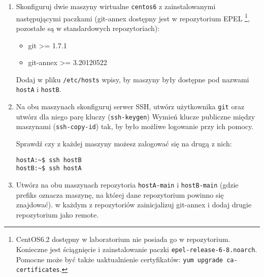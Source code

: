 \documentclass[polish]{article}
\newif\ifteacher
\begin{document}
\begin{enumerate}

    \item
    Skonfiguruj dwie maszyny wirtualne \texttt{centos6} z zainstalowanymi
    następującymi paczkami (git-annex dostępny jest w repozytorium EPEL
    \footnote{CentOS6.2 dostępny w laboratorium nie posiada go w repozytorium.
        Konieczne jest ściągnięcie i zainstalowanie paczki
        \texttt{epel-release-6-8.noarch}. Pomocne może być także uaktualnienie
        certyfikatów: \texttt{yum upgrade ca-certificates}.},
    pozostałe są w standardowych repozytoriach):

    \begin{itemize}
      \item git >= 1.7.1
      \item git-annex >= 3.20120522
    \end{itemize}

    Dodaj w pliku \texttt{/etc/hosts} wpisy, by maszyny były dostępne pod
    nazwami \texttt{hostA} i \texttt{hostB}.

\ifteacher
    \begin{lstlisting}
yum upgrade ca-certificates

wget http://download.fedoraproject.org/pub/epel/6/x86_64/ \
     epel-release-6-8.noarch.rpm
rpm -ivh epel-release-6-8.noarch.rpm

hostA:~$ ssh-keygen
hostA:~$ cat 'root123' | ssh-copy-id root@hostB

hostB:~$ ssh-keygen
hostB:~$ cat 'root123' | ssh-copy-id root@hostA
    \end{lstlisting}
\fi

    \item
    Na obu maszynach skonfiguruj serwer SSH, utwórz użytkownika \texttt{git}
    oraz utwórz dla niego parę kluczy (\texttt{ssh-keygen}) Wymień klucze
    publiczne między maszynami (\texttt{ssh-copy-id}) tak, by było możliwe
    logowanie przy ich pomocy.

    Sprawdź czy z każdej maszyny możesz zalogować się na drugą z nich:

    \begin{lstlisting}
hostA:~$ ssh hostB
hostB:~$ ssh hostA
    \end{lstlisting}

    \item
    Utwórz na obu maszynach repozytoria \texttt{hostA-main} i
    \texttt{hostB-main} (gdzie prefiks oznacza maszynę, na której dane
    repozytorium powinno się znajdować). w każdym z repozytoriów zainicjalizuj
    git-annex i dodaj drugie repozytorium jako remote.


\end{enumerate}
\end{document}
